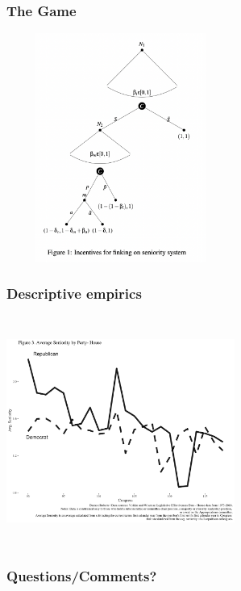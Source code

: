 \documentclass[notheorems, aspectratio=54]{beamer}
\begin{document}
\begin{frame}\frametitle{The Game}
	\begin{center}
	\includegraphics[height=75mm, width=75mm]{fig1-updated}
	\end{center}
\end{frame}
\begin{frame}\frametitle{Descriptive empirics}
	\begin{center}
		\includegraphics[height=75mm,width=75mm]{../figures/avg-house-seniority-macro}
	\end{center}
\end{frame}

\begin{frame}\frametitle{Questions/Comments?}
	
\end{frame}
\end{document}
